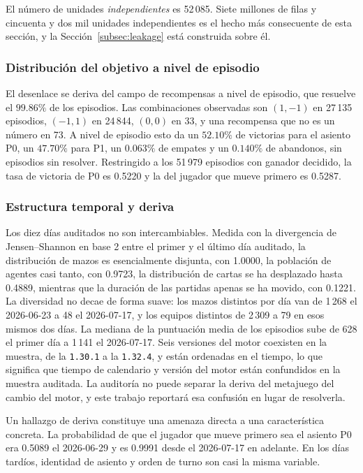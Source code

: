 \documentclass[conference]{IEEEtran}
\newcommand{\code}[1]{\texttt{#1}}
\begin{document}
El n\'umero de unidades \emph{independientes} es 52\,085. Siete millones de
filas y cincuenta y dos mil unidades independientes es el hecho m\'as
consecuente de esta secci\'on, y la Secci\'on~\ref{subsec:leakage} est\'a
construida sobre \'el.

\subsubsection{Distribuci\'on del objetivo a nivel de episodio}
El desenlace se deriva del campo de recompensas a nivel de episodio, que
resuelve el $99.86\%$ de los episodios. Las combinaciones observadas son
$(1,-1)$ en 27\,135 episodios, $(-1,1)$ en 24\,844, $(0,0)$ en 33, y una
recompensa que no es un n\'umero en 73. A nivel de episodio esto da un
$52.10\%$ de victorias para el asiento P0, un $47.70\%$ para P1, un
$0.063\%$ de empates y un $0.140\%$ de abandonos, sin episodios sin
resolver. Restringido a los 51\,979 episodios con ganador decidido, la tasa
de victoria de P0 es 0.5220 y la del jugador que mueve primero es 0.5287.

\subsubsection{Estructura temporal y deriva}
Los diez d\'ias auditados no son intercambiables. Medida con la divergencia
de Jensen--Shannon en base 2 entre el primer y el \'ultimo d\'ia auditado,
la distribuci\'on de mazos es esencialmente disjunta, con 1.0000, la
poblaci\'on de agentes casi tanto, con 0.9723, la distribuci\'on de cartas
se ha desplazado hasta 0.4889, mientras que la duraci\'on de las partidas
apenas se ha movido, con 0.1221. La diversidad no decae de forma suave: los
mazos distintos por d\'ia van de 1\,268 el 2026-06-23 a 48 el 2026-07-17, y
los equipos distintos de 2\,309 a 79 en esos mismos dos d\'ias. La mediana
de la puntuaci\'on media de los episodios sube de 628 el primer d\'ia a
1\,141 el 2026-07-17. Seis versiones del motor coexisten en la muestra, de
la \code{1.30.1} a la \code{1.32.4}, y est\'an ordenadas en el tiempo, lo
que significa que tiempo de calendario y versi\'on del motor est\'an
confundidos en la muestra auditada. La auditor\'ia no puede separar la
deriva del metajuego del cambio del motor, y este trabajo reportar\'a esa
confusi\'on en lugar de resolverla.

Un hallazgo de deriva constituye una amenaza directa a una caracter\'istica
concreta. La probabilidad de que el jugador que mueve primero sea el asiento
P0 era 0.5089 el 2026-06-29 y es 0.9991 desde el 2026-07-17 en adelante. En
los d\'ias tard\'ios, identidad de asiento y orden de turno son casi la
misma variable.
\end{document}
